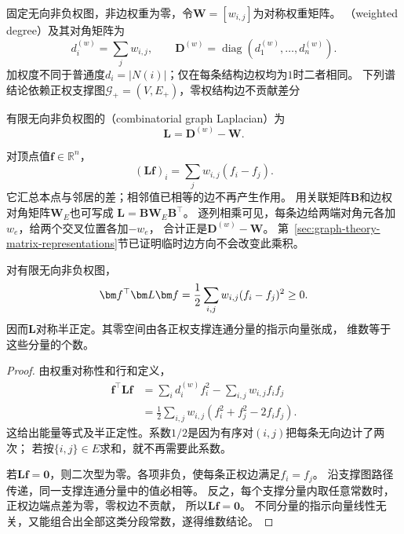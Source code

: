 固定无向非负权图，非边权重为零，令\(\bm W=[w_{i,j}]\)为对称权重矩阵。
（weighted degree）及其对角矩阵为
\[
  d_i^{(w)}=\sum_jw_{i,j},\qquad
  \bm D^{(w)}=\operatorname{diag}(d_1^{(w)},\ldots,d_n^{(w)}).
\]
加权度不同于普通度\(d_i=|N(i)|\)；仅在每条结构边权均为\(1\)时二者相同。
下列谱结论依赖正权支撑图\(\mathcal G_+=(V,E_+)\)，零权结构边不贡献差分

\begin{definition}[组合图拉普拉斯]
  \label{def:graph-theory-combinatorial-laplacian}
  有限无向非负权图的（combinatorial graph Laplacian）为
  \begin{equation}
    \bm L=\bm D^{(w)}-\bm W.
    \label{eq:graph-theory-combinatorial-laplacian}
  \end{equation}
\end{definition}

对顶点值\(\bm f\in\mathbb R^n\)，
\[
  (\bm L\bm f)_i=\sum_jw_{i,j}(f_i-f_j).
\]
它汇总本点与邻居的差；相邻值已相等的边不再产生作用。
用关联矩阵\(\bm B\)和边权对角矩阵\(\bm W_E\)也可写成
\(\bm L=\bm B\bm W_E\bm B^\top\)。
逐列相乘可见，每条边给两端对角元各加\(w_e\)，给两个交叉位置各加\(-w_e\)，
合计正是\(\bm D^{(w)}-\bm W\)。
第~\ref{sec:graph-theory-matrix-representations}节已证明临时边方向不会改变此乘积。

\begin{theorem}[图拉普拉斯的Dirichlet能量与零空间]
  \label{thm:graph-theory-laplacian-energy-nullspace}
  对有限无向非负权图，
  \begingroup
  \let\graphenergylabel\label
  \begin{equation}
    \let\label\graphenergylabel
    \bm f^\top\bm L\bm f
    =\frac12\sum_{i,j}w_{i,j}(f_i-f_j)^2\geq0.
    \label{eq:graph-theory-dirichlet-energy}
    \label{eq:signal-analysis-graph-dirichlet-energy}
  \end{equation}
  \endgroup
  因而\(\bm L\)对称半正定。其零空间由各正权支撑连通分量的指示向量张成，
  维数等于这些分量的个数。
\end{theorem}

\begin{proof}
由权重对称性和行和定义，
\begin{align*}
  \bm f^\top\bm L\bm f
  &=\sum_i d_i^{(w)}f_i^2-\sum_{i,j}w_{i,j}f_if_j\\
  &=\frac12\sum_{i,j}w_{i,j}(f_i^2+f_j^2-2f_if_j).
\end{align*}
这给出能量等式及半正定性。系数\(1/2\)是因为有序对\((i,j)\)把每条无向边计了两次；
若按\(\{i,j\}\in E\)求和，就不再需要此系数。

若\(\bm L\bm f=\bm0\)，则二次型为零。各项非负，使每条正权边满足\(f_i=f_j\)。
沿支撑图路径传递，同一支撑连通分量中的值必相等。
反之，每个支撑分量内取任意常数时，正权边端点差为零，零权边不贡献，
所以\(\bm L\bm f=\bm0\)。
不同分量的指示向量线性无关，又能组合出全部这类分段常数，遂得维数结论。
\end{proof}

